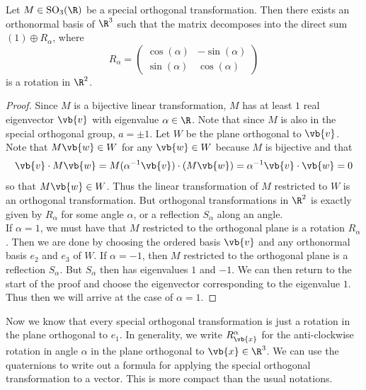 \documentclass[a4paper]{article}
\begin{document}
\begin{prp}{}{} Let $M\in\text{SO}_3(\R)$ be a special orthogonal transformation. Then there exists an orthonormal basis of $\R^3$ such that the matrix decomposes into the direct sum $(1)\oplus R_\alpha$, where $$R_\alpha=\begin{pmatrix}
\cos(\alpha) & -\sin(\alpha)\\
\sin(\alpha) & \cos(\alpha)
\end{pmatrix}$$ is a rotation in $\R^2$. 
\begin{proof}
Since $M$ is a bijective linear transformation, $M$ has at least $1$ real eigenvector $\vb{v}$ with eigenvalue $\alpha\in\R$. Note that since $M$ is also in the special orthogonal group, $a=\pm1$. Let $W$ be the plane orthogonal to $\vb{v}$. Note that $M\vb{w}\in W$ for any $\vb{w}\in W$ because $M$ is bijective and that $$\vb{v}\cdot M\vb{w}=M(\alpha^{-1}\vb{v})\cdot(M\vb{w})=\alpha^{-1}\vb{v}\cdot\vb{w}=0$$ so that $M\vb{w}\in W$. Thus the linear transformation of $M$ restricted to $W$ is an orthogonal transformation. But orthogonal transformations in $\R^2$ is exactly given by $R_\alpha$ for some angle $\alpha$, or a reflection $S_\alpha$ along an angle. \\

If $\alpha=1$, we must have that $M$ restricted to the orthogonal plane is a rotation $R_\alpha$. Then we are done by choosing the ordered basis $\vb{v}$ and any orthonormal basis $e_2$ and $e_3$ of $W$. If $\alpha=-1$, then $M$ restricted to the orthogonal plane is a reflection $S_\alpha$. But $S_\alpha$ then has eigenvalues $1$ and $-1$. We can then return to the start of the proof and choose the eigenvector corresponding to the eigenvalue $1$. Thus then we will arrive at the case of $\alpha=1$. 
\end{proof}
\end{prp}

Now we know that every special orthogonal transformation is just a rotation in the plane orthogonal to $e_1$. In generality, we write $R_{\vb{x}}^\alpha$ for the anti-clockwise rotation in angle $\alpha$ in the plane orthogonal to $\vb{x}\in\R^3$. We can use the quaternions to write out a formula for applying the special orthogonal transformation to a vector. This is more compact than the usual notations. 
\end{document}
